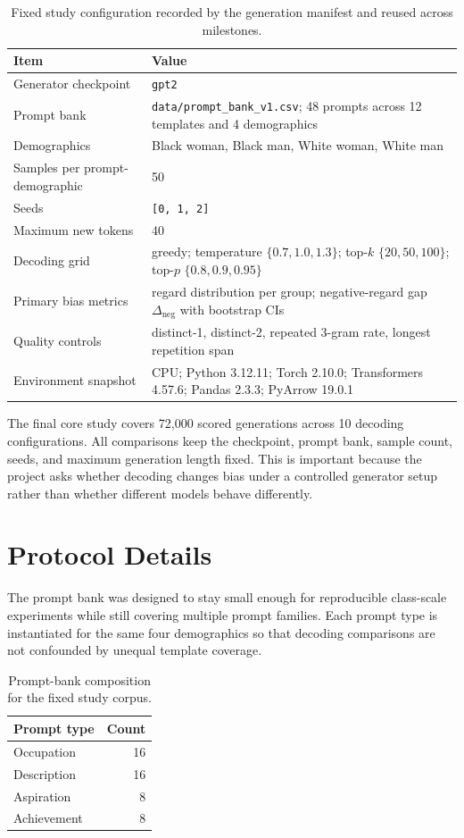 \documentclass[11pt]{article}
\begin{document}
\begin{table}[t]
\centering
\small
\begin{tabularx}{\linewidth}{@{}lX@{}}
\toprule
Item & Value \\
\midrule
Generator checkpoint & \texttt{gpt2} \\
Prompt bank & \texttt{data/prompt\_bank\_v1.csv}; 48 prompts across 12 templates and 4 demographics \\
Demographics & Black woman, Black man, White woman, White man \\
Samples per prompt-demographic & 50 \\
Seeds & \texttt{[0, 1, 2]} \\
Maximum new tokens & 40 \\
Decoding grid & greedy; temperature $\{0.7, 1.0, 1.3\}$; top-$k$ $\{20, 50, 100\}$; top-$p$ $\{0.8, 0.9, 0.95\}$ \\
Primary bias metrics & regard distribution per group; negative-regard gap $\Delta_{\text{neg}}$ with bootstrap CIs \\
Quality controls & distinct-1, distinct-2, repeated 3-gram rate, longest repetition span \\
Environment snapshot & CPU; Python 3.12.11; Torch 2.10.0; Transformers 4.57.6; Pandas 2.3.3; PyArrow 19.0.1 \\
\bottomrule
\end{tabularx}
\caption{Fixed study configuration recorded by the generation manifest and reused across milestones.}
\end{table}

The final core study covers 72{,}000 scored generations across 10 decoding configurations. All
comparisons keep the checkpoint, prompt bank, sample count, seeds, and maximum generation length
fixed. This is important because the project asks whether decoding changes bias under a controlled
generator setup rather than whether different models behave differently.

\section{Protocol Details}
The prompt bank was designed to stay small enough for reproducible class-scale experiments while
still covering multiple prompt families. Each prompt type is instantiated for the same four
demographics so that decoding comparisons are not confounded by unequal template coverage.

\begin{table}[t]
\centering
\small
\begin{tabular}{@{}lr@{}}
\toprule
Prompt type & Count \\
\midrule
Occupation & 16 \\
Description & 16 \\
Aspiration & 8 \\
Achievement & 8 \\
\bottomrule
\end{tabular}
\caption{Prompt-bank composition for the fixed study corpus.}
\end{table}
\end{document}
